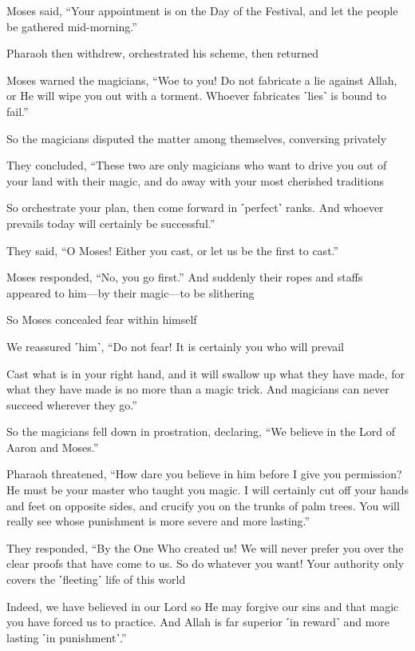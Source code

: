 Moses said, “Your appointment is on the Day of the Festival, and let the people be gathered mid-morning.”

Pharaoh then withdrew, orchestrated his scheme, then returned

Moses warned the magicians, “Woe to you! Do not fabricate a lie against Allah, or He will wipe you out with a torment. Whoever fabricates ˹lies˺ is bound to fail.”

So the magicians disputed the matter among themselves, conversing privately

They concluded, “These two are only magicians who want to drive you out of your land with their magic, and do away with your most cherished traditions

So orchestrate your plan, then come forward in ˹perfect˺ ranks. And whoever prevails today will certainly be successful.”

They said, “O Moses! Either you cast, or let us be the first to cast.”

Moses responded, “No, you go first.” And suddenly their ropes and staffs appeared to him—by their magic—to be slithering

So Moses concealed fear within himself

We reassured ˹him˺, “Do not fear! It is certainly you who will prevail

Cast what is in your right hand, and it will swallow up what they have made, for what they have made is no more than a magic trick. And magicians can never succeed wherever they go.”

So the magicians fell down in prostration, declaring, “We believe in the Lord of Aaron and Moses.”

Pharaoh threatened, “How dare you believe in him before I give you permission? He must be your master who taught you magic. I will certainly cut off your hands and feet on opposite sides, and crucify you on the trunks of palm trees. You will really see whose punishment is more severe and more lasting.”

They responded, “By the One Who created us! We will never prefer you over the clear proofs that have come to us. So do whatever you want! Your authority only covers the ˹fleeting˺ life of this world

Indeed, we have believed in our Lord so He may forgive our sins and that magic you have forced us to practice. And Allah is far superior ˹in reward˺ and more lasting ˹in punishment˺.”


